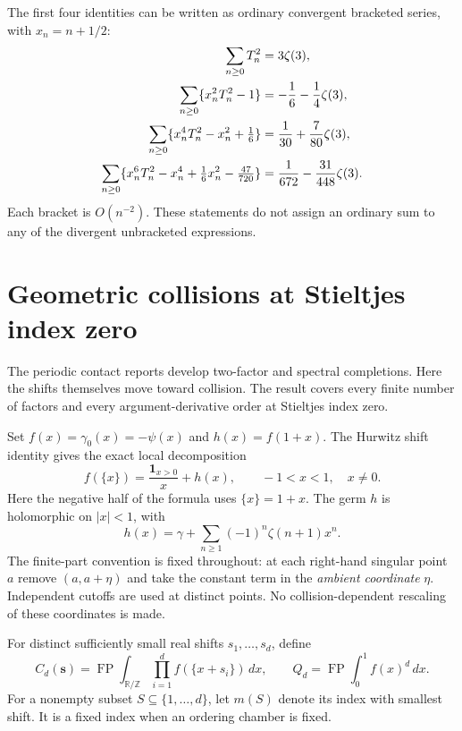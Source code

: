 \documentclass[11pt]{article}
\numberwithin{equation}{section}
\theoremstyle{definition}
\theoremstyle{remark}
\begin{document}
The first four identities can be written as ordinary convergent
bracketed series, with $x_n=n+1/2$:
\begin{align}
 \sum_{n\ge0}T_n^2&=3\zeta(3),\notag\\
 \sum_{n\ge0}\{x_n^2T_n^2-1\}
        &=-\frac16-\frac14\zeta(3),\notag\\
 \sum_{n\ge0}\{x_n^4T_n^2-x_n^2+\tfrac16\}
        &=\frac1{30}+\frac7{80}\zeta(3),\label{hc:moment-examples}\\
 \sum_{n\ge0}\{x_n^6T_n^2-x_n^4+\tfrac16x_n^2-\tfrac{47}{720}\}
        &=\frac1{672}-\frac{31}{448}\zeta(3).\notag
\end{align}
Each bracket is $O(n^{-2})$. These statements do not assign an
ordinary sum to any of the divergent unbracketed expressions.



\section{Geometric collisions at Stieltjes index zero}
\label{gc:section}

The periodic contact reports \cite{RepoPeriodic,RepoContact,RepoMixed} develop
two-factor and spectral completions. Here the shifts themselves move toward
collision. The result covers every finite number of factors and every
argument-derivative order at Stieltjes index zero.

Set $f(x)=\gamma_0(x)=-\psi(x)$ and $h(x)=f(1+x)$.  The Hurwitz shift
identity gives the exact local decomposition
\begin{equation}\label{gc:one-sided}
 f(\{x\})=\frac{\boldsymbol{1}_{x>0}}x+h(x),\qquad -1<x<1,
 \quad x\ne0.
\end{equation}
Here the negative half of the formula uses $\{x\}=1+x$.  The germ $h$ is
holomorphic on $|x|<1$, with
\begin{equation}\label{gc:hseries}
 h(x)=\gamma+\sum_{n\ge1}(-1)^n\zeta(n+1)x^n.
\end{equation}
The finite-part convention is fixed throughout: at each right-hand
singular point $a$ remove $(a,a+\eta)$ and take the constant term in the
\emph{ambient coordinate} $\eta$.  Independent cutoffs are used at distinct
points.  No collision-dependent rescaling of these coordinates is made.

For distinct sufficiently small real shifts $s_1,\ldots,s_d$, define
\begin{equation}\label{gc:Cdef}
 C_d(\boldsymbol{s})=
 \operatorname{FP}\int_{\mathbb R/\mathbb Z}
       \prod_{i=1}^d f(\{x+s_i\})\,dx,
 \qquad
 Q_d=\operatorname{FP}\int_0^1 f(x)^d\,dx.
\end{equation}
For a nonempty subset $S\subseteq\{1,\ldots,d\}$, let $m(S)$ denote its
index with smallest shift.  It is a fixed index when an ordering chamber
is fixed.
\end{document}
